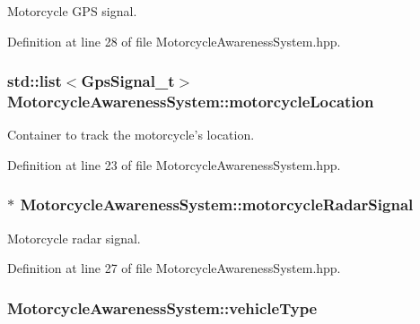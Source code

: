 Motorcycle G\-P\-S signal. 



Definition at line 28 of file Motorcycle\-Awareness\-System.\-hpp.

\hypertarget{classMotorcycleAwarenessSystem_af6becfeb1d11b467cb80a94a8e6940ac}{
\subsubsection[{motorcycle\-Location}]{\setlength{\rightskip}{0pt plus 5cm}std\-::list$<${\bf Gps\-Signal\-\_\-t}$>$ Motorcycle\-Awareness\-System\-::motorcycle\-Location\hspace{0.3cm}{\ttfamily [private]}}}\label{classMotorcycleAwarenessSystem_af6becfeb1d11b467cb80a94a8e6940ac}


Container to track the motorcycle's location. 



Definition at line 23 of file Motorcycle\-Awareness\-System.\-hpp.

\hypertarget{classMotorcycleAwarenessSystem_a0744e71b9f440a86f5078c876ba7629b}{
\subsubsection[{motorcycle\-Radar\-Signal}]{$\ast$ Motorcycle\-Awareness\-System\-::motorcycle\-Radar\-Signal\hspace{0.3cm}{\ttfamily [private]}}}\label{classMotorcycleAwarenessSystem_a0744e71b9f440a86f5078c876ba7629b}


Motorcycle radar signal. 



Definition at line 27 of file Motorcycle\-Awareness\-System.\-hpp.

\hypertarget{classMotorcycleAwarenessSystem_a977b2085bfbf6a62902bf2d80160e6d2}{
\subsubsection[{vehicle\-Type}]{ Motorcycle\-Awareness\-System\-::vehicle\-Type\hspace{0.3cm}{\ttfamily [private]}}}\label{classMotorcycleAwarenessSystem_a977b2085bfbf6a62902bf2d80160e6d2}


